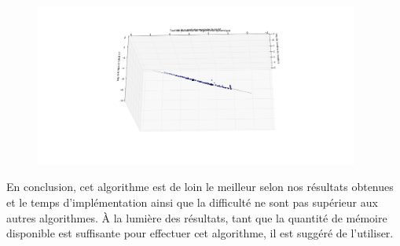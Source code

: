 \documentclass[a4paper, 12pt]{article} %
\begin{document}
    \begin{figure}
    	\centering
        \includegraphics[width=0.95\textwidth]{Figure/AlgorithmeDynamique2.png}
    \end{figure}

    \vspace{12pt}
    En conclusion, cet algorithme est de loin le meilleur selon nos résultats obtenues et le temps
    d'implémentation ainsi que la difficulté ne sont pas supérieur aux autres algorithmes. À la lumière
    des résultats, tant que la quantité de mémoire disponible est suffisante pour effectuer cet algorithme, 
    il est suggéré de l'utiliser.


\end{document}
